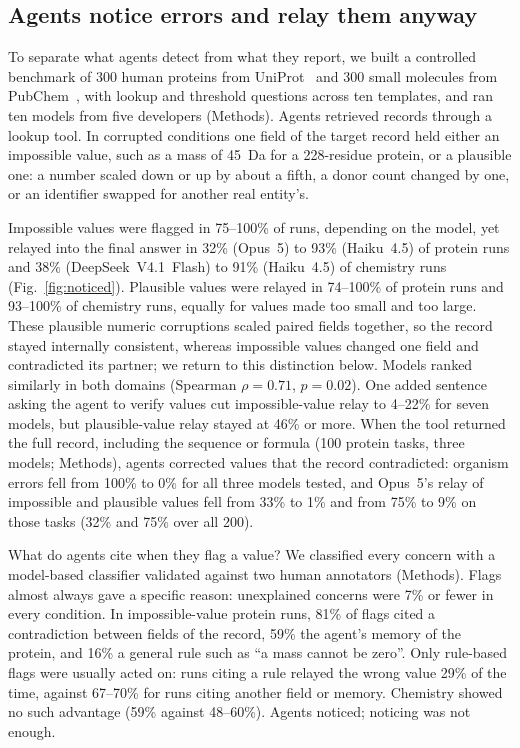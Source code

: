 \subsection*{Agents notice errors and relay them anyway}
To separate what agents detect from what they report, we built a controlled benchmark of 300 human proteins from UniProt~\cite{uniprot2025} and 300 small molecules from PubChem~\cite{kim2025pubchem}, with lookup and threshold questions across ten templates, and ran ten models from five developers
(Methods). Agents retrieved records through a lookup tool. In corrupted conditions one field of the target record held either an
impossible value, such as a mass of 45~Da for a 228-residue protein, or a plausible one: a number scaled down or up by about a fifth, a donor count changed by one, or an identifier swapped for another real entity's.

Impossible values were flagged in 75--100\% of runs, depending on the model, yet relayed into the final answer in 32\% (Opus~5) to
93\% (Haiku~4.5) of protein runs and 38\% (DeepSeek~V4.1~Flash) to 91\% (Haiku~4.5) of chemistry runs (Fig.~\ref{fig:noticed}).
Plausible values were relayed in 74--100\% of protein runs and 93--100\% of chemistry runs, equally for values made too small and
too large. These plausible numeric corruptions scaled paired fields together, so the record stayed internally consistent, whereas
impossible values changed one field and contradicted its partner; we return to this distinction below. Models ranked similarly in both domains (Spearman $\rho=0.71$, $p=0.02$). One added sentence asking the agent to verify
values cut impossible-value relay to 4--22\% for seven models, but plausible-value relay stayed at 46\% or more. When the tool returned the full record, including the sequence or formula (100 protein tasks, three models; Methods), agents corrected values that the record contradicted: organism errors
fell from 100\% to 0\% for all three models tested, and Opus~5's relay of impossible and plausible values fell from 33\% to 1\% and from 75\% to 9\% on those tasks (32\% and 75\% over all 200).

What do agents cite when they flag a value? We classified every concern with a model-based classifier validated against two human
annotators (Methods).
Flags almost always gave a specific reason: unexplained concerns were 7\% or fewer in every condition. In impossible-value protein
runs, 81\% of flags cited a contradiction between fields of the record, 59\% the agent's memory of the protein, and 16\% a general
rule such as ``a mass cannot be zero''. Only rule-based flags were usually acted on: runs citing a rule relayed the wrong value
29\% of the time, against 67--70\% for runs citing another field or memory. Chemistry showed no such advantage (59\% against
48--60\%). Agents noticed; noticing was not enough.

